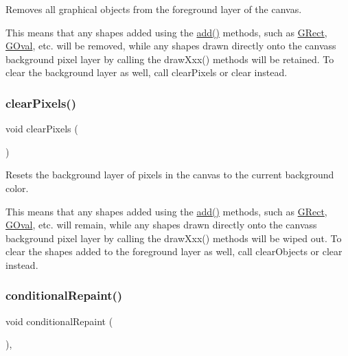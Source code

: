 Removes all graphical objects from the foreground layer of the canvas. 

This means that any shapes added using the \mbox{\hyperlink{classGCanvas_afe8277e7b2627513c6f7452fb0b2847d}{add()}} methods, such as \mbox{\hyperlink{classGRect}{G\+Rect}}, \mbox{\hyperlink{classGOval}{G\+Oval}}, etc. will be removed, while any shapes drawn directly onto the canvas\textquotesingle{}s background pixel layer by calling the draw\+Xxx() methods will be retained. To clear the background layer as well, call clear\+Pixels or clear instead. \mbox{\label{classGCanvas_ab2c8590176aec1da6fb4e9b836bab630}} 
\subsubsection{\texorpdfstring{clear\+Pixels()}{clearPixels()}}
{\footnotesize\ttfamily void clear\+Pixels (\begin{DoxyParamCaption}{ }\end{DoxyParamCaption})\hspace{0.3cm}{\ttfamily [virtual]}}



Resets the background layer of pixels in the canvas to the current background color. 

This means that any shapes added using the \mbox{\hyperlink{classGCanvas_afe8277e7b2627513c6f7452fb0b2847d}{add()}} methods, such as \mbox{\hyperlink{classGRect}{G\+Rect}}, \mbox{\hyperlink{classGOval}{G\+Oval}}, etc. will remain, while any shapes drawn directly onto the canvas\textquotesingle{}s background pixel layer by calling the draw\+Xxx() methods will be wiped out. To clear the shapes added to the foreground layer as well, call clear\+Objects or clear instead. \mbox{\label{classGDrawingSurface_a221b3e75bb3d9d0bfea62b3364e6773b}} 
\subsubsection{\texorpdfstring{conditional\+Repaint()}{conditionalRepaint()}}
{\footnotesize\ttfamily void conditional\+Repaint (\begin{DoxyParamCaption}{ }\end{DoxyParamCaption})\hspace{0.3cm}{\ttfamily [virtual]}, {\ttfamily [inherited]}}



